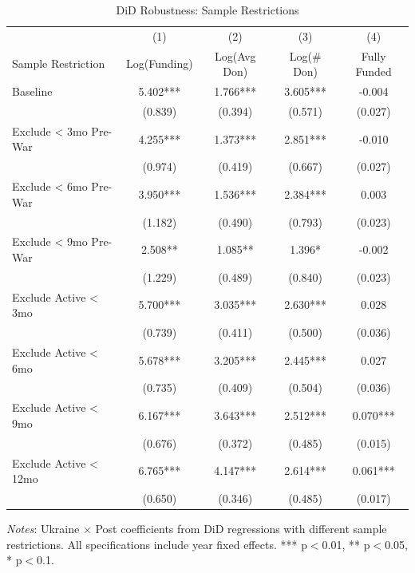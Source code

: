 \begin{table}[htbp]
\centering
\caption{DiD Robustness: Sample Restrictions}
\label{tab:did_robust}
\begin{threeparttable}
\small
\begin{tabular}{lcccc}
\toprule
& (1) & (2) & (3) & (4) \\
Sample Restriction & Log(Funding) & Log(Avg Don) & Log(\# Don) & Fully Funded \\
\midrule
Baseline & 5.402*** & 1.766*** & 3.605*** & -0.004 \\
& (0.839) & (0.394) & (0.571) & (0.027) \\
Exclude < 3mo Pre-War & 4.255*** & 1.373*** & 2.851*** & -0.010 \\
& (0.974) & (0.419) & (0.667) & (0.027) \\
Exclude < 6mo Pre-War & 3.950*** & 1.536*** & 2.384*** & 0.003 \\
& (1.182) & (0.490) & (0.793) & (0.023) \\
Exclude < 9mo Pre-War & 2.508** & 1.085** & 1.396* & -0.002 \\
& (1.229) & (0.489) & (0.840) & (0.023) \\
Exclude Active < 3mo & 5.700*** & 3.035*** & 2.630*** & 0.028 \\
& (0.739) & (0.411) & (0.500) & (0.036) \\
Exclude Active < 6mo & 5.678*** & 3.205*** & 2.445*** & 0.027 \\
& (0.735) & (0.409) & (0.504) & (0.036) \\
Exclude Active < 9mo & 6.167*** & 3.643*** & 2.512*** & 0.070*** \\
& (0.676) & (0.372) & (0.485) & (0.015) \\
Exclude Active < 12mo & 6.765*** & 4.147*** & 2.614*** & 0.061*** \\
& (0.650) & (0.346) & (0.485) & (0.017) \\
\bottomrule
\end{tabular}
\begin{tablenotes}
\small
\item \textit{Notes}: Ukraine $\times$ Post coefficients from DiD regressions with different sample restrictions. All specifications include year fixed effects. *** p$<$0.01, ** p$<$0.05, * p$<$0.1.
\end{tablenotes}
\end{threeparttable}
\end{table}

